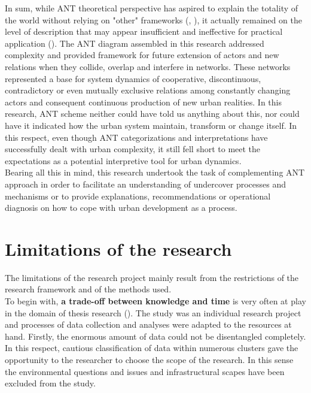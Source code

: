 \documentclass[11pt]{report}
\begin{document}
{{{In sum, while ANT theoretical perspective has aspired to explain the totality of the world without relying on "other" frameworks (\href{ref}{\citealt{lee_otherness_1994}},  \href{ref}{\citealt{gad_consequences_2010}}), it actually remained on the level of description that may appear insufficient and ineffective for practical application (\href{ref}{\citealt{gabriel_post-social_2008}}).
The ANT diagram assembled in this research addressed complexity and provided framework for future extension of actors and new relations when they collide, overlap and interfere in networks.
These networks represented a base for system dynamics of cooperative, discontinuous, contradictory or even mutually exclusive relations among constantly changing actors and consequent continuous production of new urban realities.
In this research, ANT scheme neither could have told us anything about this, nor could have it indicated how the urban system maintain, transform or change itself. In this respect, even though ANT categorizations and interpretations have successfully dealt with urban complexity, it still fell short to meet the expectations as a potential interpretive tool for urban dynamics.
\\

Bearing all this in mind, this research undertook the task of complementing ANT approach in order to facilitate an understanding of undercover processes and mechanisms or to provide explanations, recommendations or operational diagnosis on how to cope with urban development as a process.

\section{Limitations of the research}

The limitations of the research project mainly result from the restrictions of the research framework and of the methods used.
\\

To begin with, \textbf{a trade-off between knowledge and time} is very often at play in the domain of thesis research (\href{Harrison}{\citealt{Harrison 2002}}).
The study was an individual research project and processes of data collection and analyses were adapted to the resources at hand.
Firstly, the enormous amount of data could not be disentangled completely. In this respect, cautious classification of data within numerous clusters gave the opportunity to the researcher to choose the scope of the research.
In this sense the environmental questions and issues and infrastructural scapes have been excluded from the study.
\\

}}}
\end{document}
